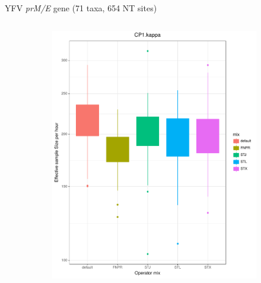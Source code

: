 \documentclass[newPxFont,numfooter,sectionpages]{beamer}
\begin{document}
\begin{frame}{YFV \textit{prM/E} gene (71 taxa, 654 NT sites)}
\begin{figure}
\begin{column}{0.5\textwidth}
    \begin{figure}
     \includegraphics[width=\textwidth]{figures/ESS_hour_CP1Kappa_YFV.pdf} \\
     \end{figure}
\end{column}
\begin{column}{0.5\textwidth}  %
    \begin{figure}

\end{figure}
\end{column}
\end{figure}
\end{frame}
\end{document}
